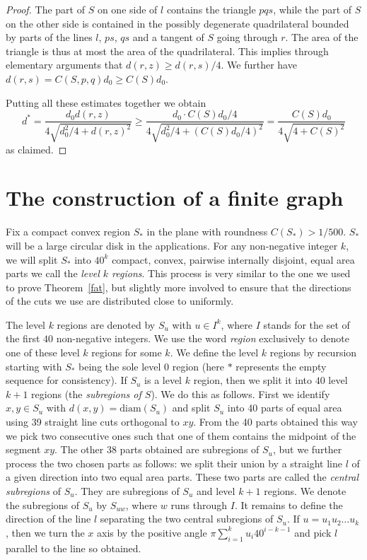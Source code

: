 \documentclass[12pt]{article}
\theoremstyle{plain}
\theoremstyle{definition}
\theoremstyle{remark}
\def\diam{\mathrm{diam}}
\begin{document}
\begin{proof}
The part of $S$ on one side of $l$ contains the triangle $pqs$, while the part of $S$ on the other side is contained in the possibly degenerate quadrilateral bounded by parts of the lines $l$, $ps$, $qs$ and a tangent of $S$ going through $r$. The area of the triangle is thus at most the area of the quadrilateral. This implies through elementary arguments that $d(r,z)\ge d(r,s)/4$. We further have $d(r,s)=C(S,p,q)d_0\ge C(S)d_0$.

Putting all these estimates together we obtain
$$d^*=\frac{d_0d(r,z)}{4\sqrt{d_0^2/4+d(r,z)^2}}\ge\frac{d_0\cdot C(S)d_0/4}{4\sqrt{d_0^2/4+(C(S)d_0/4)^2}}=\frac{C(S)d_0}{4\sqrt{4+C(S)^2}}$$
as claimed.
\end{proof}

\section{The construction of a finite graph}\label{sec3}

Fix a compact convex region $S_*$ in the plane with roundness $C(S_*)>1/500$. $S_*$ will be a large circular disk in the applications. For any non-negative integer $k$, we will split $S_*$ into $40^k$ compact, convex, pairwise internally disjoint, equal area parts we call the \emph{level $k$ regions}. This process is very similar to the one we used to prove Theorem~\ref{fat}, but slightly more involved to ensure that the directions of the cuts we use are distributed close to uniformly.

The level $k$ regions are denoted by $S_u$ with $u\in I^k$, where $I$ stands for the set of the first $40$ non-negative integers. We use the word \emph{region} exclusively to denote one of these level $k$ regions for some $k$. We define the level $k$ regions by recursion starting with $S_*$ being the sole level $0$ region (here $*$ represents the empty sequence for consistency). If $S_u$ is a  level $k$ region, then we split it into $40$ level $k+1$ regions (the \emph{subregions of $S$}). We do this as follows. First we identify $x,y\in S_u$ with $d(x,y)=\diam(S_u)$ and split $S_u$ into 40 parts of equal area using 39 straight line cuts orthogonal to $xy$. From the 40 parts obtained this way we pick two consecutive ones such that one of them contains the midpoint of the segment $xy$. The other 38 parts obtained are subregions of $S_u$, but we further process the two chosen parts as follows: we split their union by a straight line $l$ of a given direction into two equal area parts. These two parts are called the \emph{central subregions} of $S_u$. They are subregions of $S_u$ and level $k+1$ regions. We denote the subregions of $S_u$ by $S_{uw}$, where $w$ runs through $I$. It remains to define the direction of the line $l$ separating the two central subregions of $S_u$. If $u=u_1u_2\ldots u_k$, then we turn the $x$ axis by the positive angle $\pi\sum_{i=1}^ku_i40^{i-k-1}$ and pick $l$ parallel to the line so obtained.
\end{document}
